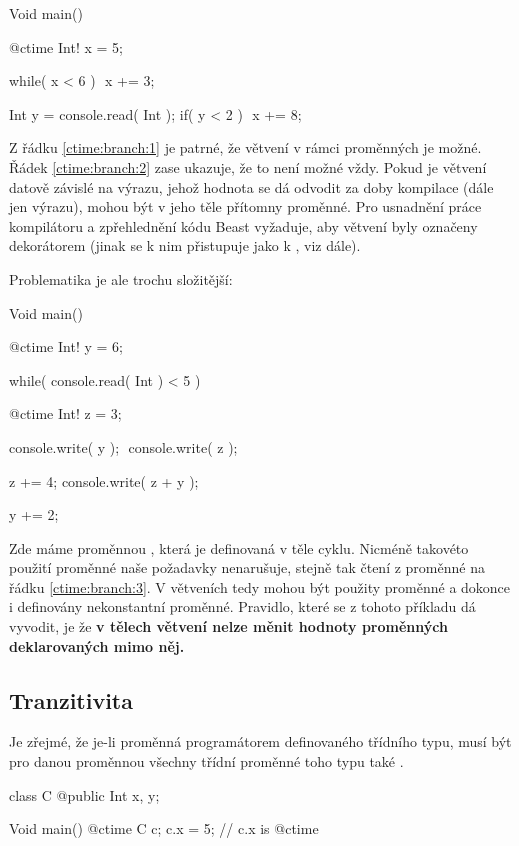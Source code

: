 \begin{code}
Void main() {
	@ctime Int! x = 5;
	
	while( x < 6 ) $\label{ctime:branch:1}$
		x += 3;

	Int y = console.read( Int );
	if( y < 2 ) $\label{ctime:branch:2}$
		x += 8;
}
\end{code}

Z řádku \ref{ctime:branch:1} je patrné, že větvení v rámci \ctime proměnných je možné. Řádek \ref{ctime:branch:2} zase ukazuje, že to není možné vždy. Pokud je větvení datově závislé na výrazu, jehož hodnota se dá odvodit za doby kompilace (dále jen \ctime výrazu), mohou být v jeho těle přítomny \ctime proměnné. Pro usnadnění práce kompilátoru a zpřehlednění kódu Beast vyžaduje, aby \ctime větvení byly označeny dekorátorem (jinak se k nim přistupuje jako k \nonctime, viz dále).

Problematika je ale trochu složitější:

\begin{code}
Void main() {
	@ctime Int! y = 6;

	while( console.read( Int ) < 5 ) {
		@ctime Int! z = 3;
				
		console.write( y );	$\label{ctime:branch:3}$
		console.write( z );
		
		z += 4;
		console.write( z + y );
		
		y += 2;
	}
}
\end{code}

Zde máme proměnnou , která je definovaná v těle \nonctime cyklu. Nicméně takovéto použití proměnné naše požadavky nenarušuje, stejně tak čtení z proměnné  na řádku \ref{ctime:branch:3}. V \nonctime větveních tedy mohou být použity \ctime proměnné a dokonce i definovány nekonstantní \ctime proměnné. Pravidlo, které se z tohoto příkladu dá vyvodit, je že \textbf{v tělech \nonctime větvení nelze měnit hodnoty \ctime proměnných deklarovaných mimo něj.}

\subsection{Tranzitivita \ctime}
Je zřejmé, že je-li proměnná \ctime programátorem definovaného třídního typu, musí být pro danou proměnnou všechny třídní proměnné toho typu také \ctime.

\begin{code}
class C {
	@public Int x, y;
}

Void main() {
	@ctime C c;
	c.x = 5; // c.x is @ctime
}
\end{code}

